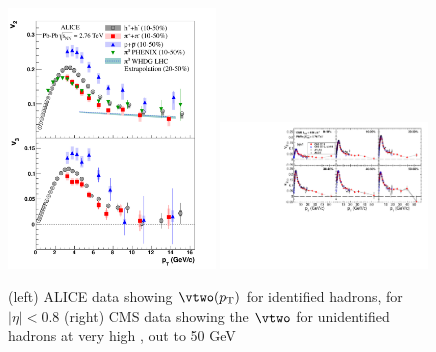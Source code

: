 \begin{figure}[!htb]
\begin{center}
\includegraphics[width=0.49\textwidth]{flowcorrelations_figs/fig5_vn_pid.pdf}
\includegraphics[width=0.49\textwidth]{flowcorrelations_figs/v2_pt_ep_atlas_alice_eta0-1_band_v5.pdf}
\caption[]{(left) ALICE data showing $\vtwo(\pT)$ for identified hadrons, for $|\eta|<0.8$ (right) CMS data showing the $\vtwo$ for unidentified hadrons at very high \pT, out to 50 GeV}
\label{fig:pas:fc:highpt}
\end{center}
\end{figure}

